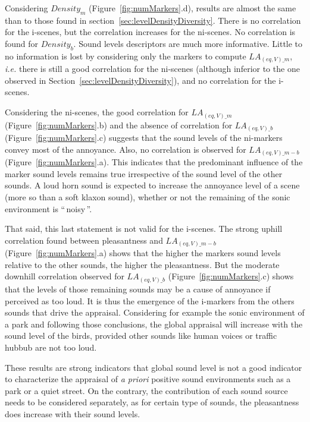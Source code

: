 \documentclass[twoside,twocolumn]{article}
\begin{document}
Considering $Density_{m}$ (Figure~\ref{fig:numMarkers}.d), results are almost the same than to those found in section~\ref{sec:levelDensityDiversity}. There is no correlation for the i-scenes, but the correlation increases for the ni-scenes. No correlation is found for $Density_{b}$. Sound levels descriptors are much more informative. Little to no information is lost by considering only the markers to compute $LA_{(eq,V)\_m}$, \emph{i.e.} there is still a good correlation for the ni-scenes (although inferior to the one observed in Section~\ref{sec:levelDensityDiversity}), and no correlation for the i-scenes.

Considering the ni-scenes, the good correlation for $LA_{(eq,V)\_m}$  (Figure~\ref{fig:numMarkers}.b) and the absence of correlation for $LA_{(eq,V)\_b}$  (Figure~\ref{fig:numMarkers}.c) suggests that the sound levels of the ni-markers convey most of the annoyance. Also, no correlation is observed for $LA_{(eq,V)\_m-b}$ (Figure~\ref{fig:numMarkers}.a). This indicates that the predominant influence of the marker sound levels remains true irrespective of the sound level of the other sounds. A loud horn sound is expected to increase the annoyance level of a scene (more so than a soft klaxon sound), whether or not the remaining of the sonic environment is ``\,noisy\,''.

That said, this last statement is not valid for the i-scenes. The strong uphill correlation found between pleasantness and  $LA_{(eq,V)\_m-b}$ (Figure~\ref{fig:numMarkers}.a) shows that the higher the markers sound levels relative to the other sounds, the higher the pleasantness. But the moderate downhill correlation observed for $LA_{(eq,V)\_b}$ (Figure~\ref{fig:numMarkers}.c) shows that the levels of those remaining sounds may be a cause of annoyance if perceived as too loud. It is thus the emergence of the i-markers from the others sounds that drive the appraisal. Considering for example the sonic environment of a park and following those conclusions, the global appraisal will increase with the sound level of the birds, provided other sounds like human voices or traffic hubbub are not too loud.

These results are strong indicators that global sound level is not a good indicator to characterize the appraisal of \emph{a priori} positive sound environments such as a park or a quiet street. On the contrary, the contribution of each sound source needs to be considered separately, as for certain type of sounds, the pleasantness does increase with their sound levels.
\end{document}

